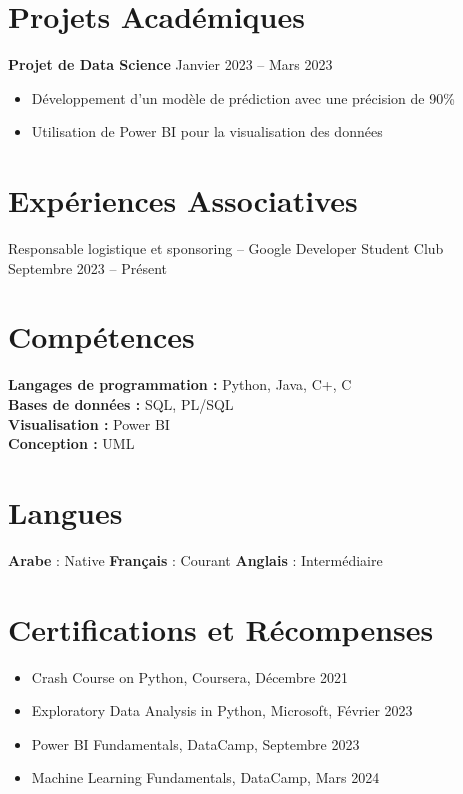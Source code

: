 \documentclass[9pt]{article}
\newcommand{\cvitem}[2]{#2}
\begin{document}
\section*{Projets Académiques}
\textbf{Projet de Data Science} \hfill Janvier 2023 -- Mars 2023
\begin{itemize}[itemsep=-0.2em]
    \item Développement d'un modèle de prédiction avec une précision de 90\%
    \item Utilisation de Power BI pour la visualisation des données
\end{itemize}

\section*{Expériences Associatives}
Responsable logistique et sponsoring -- Google Developer Student Club \hfill Septembre 2023 -- Présent

\section*{Compétences}
\cvitem{}{%
  \textbf{Langages de programmation :} Python, Java, C\++, C \\
  \textbf{Bases de données :} SQL, PL/SQL \\
  \textbf{Visualisation :} Power BI \\
  \textbf{Conception :} UML
}

\section*{Langues}
\begin{center}
\textbf{Arabe} : Native \hspace{1em} \textbf{Français} : Courant \hspace{1em} \textbf{Anglais} : Intermédiaire
\end{center}

\section*{Certifications et Récompenses}
\begin{itemize}[itemsep=-0.2em] 
    \item Crash Course on Python, Coursera, Décembre 2021
    \item Exploratory Data Analysis in Python, Microsoft, Février 2023
    \item Power BI Fundamentals, DataCamp, Septembre 2023
    \item Machine Learning Fundamentals, DataCamp, Mars 2024
\end{itemize}
\end{document}

